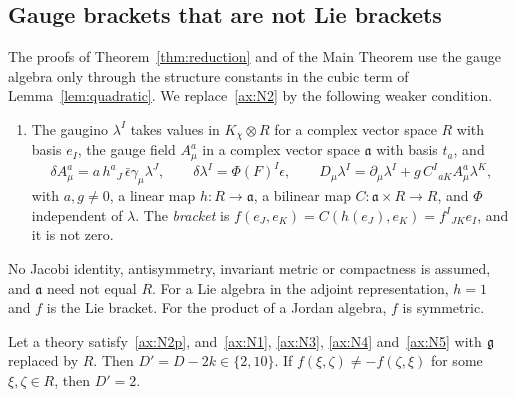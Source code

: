 \subsection{Gauge brackets that are not Lie brackets}
\label{ssec:brackets}

The proofs of Theorem~\ref{thm:reduction} and of the Main Theorem use the gauge algebra only through the structure constants in the cubic term of Lemma~\ref{lem:quadratic}. We replace~\ref{ax:N2} by the following weaker condition.
\begin{enumerate}[label=(N2$'$)]
\item\label{ax:N2p} The gaugino $\lambda^I$ takes values in $K_\chi\otimes R$ for a complex vector space $R$ with basis $e_I$, the gauge field $A^a_\mu$ in a complex vector space $\mathfrak a$ with basis $t_a$, and
\[
\delta A^a_\mu=a\,h^a{}_J\,\bar\epsilon\gamma_\mu\lambda^J,\qquad \delta\lambda^I=\Phi(F)^I\epsilon,\qquad D_\mu\lambda^I=\partial_\mu\lambda^I+g\,C^I{}_{aK}A^a_\mu\lambda^K,
\]
with $a,g\ne0$, a linear map $h:R\to\mathfrak a$, a bilinear map $C:\mathfrak a\times R\to R$, and $\Phi$ independent of $\lambda$. The \emph{bracket} is $f(e_J,e_K)=C(h(e_J),e_K)=f^I{}_{JK}e_I$, and it is not zero.
\end{enumerate}
No Jacobi identity, antisymmetry, invariant metric or compactness is assumed, and $\mathfrak a$ need not equal $R$. For a Lie algebra in the adjoint representation, $h=1$ and $f$ is the Lie bracket. For the product of a Jordan algebra, $f$ is symmetric.

\begin{theorem}
\label{thm:bracket}
Let a theory satisfy~\ref{ax:N2p}, and~\ref{ax:N1}, \ref{ax:N3}, \ref{ax:N4} and~\ref{ax:N5} with $\mathfrak{g}$ replaced by $R$. Then $D'=D-2k\in\{2,10\}$. If $f(\xi,\zeta)\ne-f(\zeta,\xi)$ for some $\xi,\zeta\in R$, then $D'=2$.
\end{theorem}

